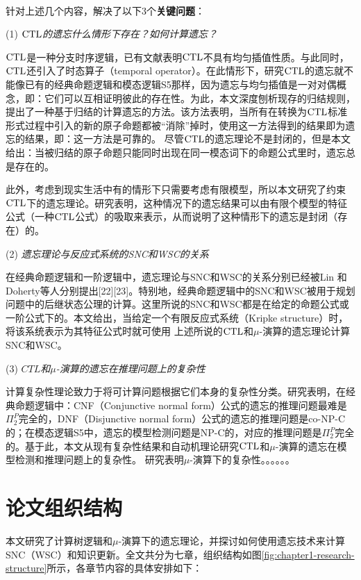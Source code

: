 ~\\
针对上述几个内容，解决了以下3个\textbf{关键问题}：

(1) {\em $\textrm{CTL}$的遗忘什么情形下存在？如何计算遗忘？}

$\textrm{CTL}$是一种分支时序逻辑，已有文献表明$\textrm{CTL}$不具有均匀插值性质。与此同时，$\textrm{CTL}$还引入了时态算子（temporal operator）。在此情形下，研究$\textrm{CTL}$的遗忘就不能像已有的经典命题逻辑和模态逻辑S5那样，因为遗忘与均匀插值是一对对偶概念，即：它们可以互相证明彼此的存在性。为此，本文深度刨析现存的归结规则，提出了一种基于归结的计算遗忘的方法。该方法表明，当所有在转换为$\textrm{CTL}$标准形式过程中引入的新的原子命题都被“消除”掉时，使用这一方法得到的结果即为遗忘的结果，即：这一方法是可靠的。
尽管$\textrm{CTL}$的遗忘理论不是封闭的，但是本文给出：当被归结的原子命题只能同时出现在同一模态词下的命题公式里时，遗忘总是存在的。

此外，考虑到现实生活中有的情形下只需要考虑有限模型，所以本文研究了约束$\textrm{CTL}$下的遗忘理论。研究表明，这种情况下的遗忘结果可以由有限个模型的特征公式（一种$\textrm{CTL}$公式）的吸取来表示，从而说明了这种情形下的遗忘是封闭（存在）的。

(2) {\em 遗忘理论与反应式系统的SNC和WSC的关系}

在经典命题逻辑和一阶逻辑中，遗忘理论与SNC和WSC的关系分别已经被Lin 和 Doherty等人分别提出[22][23]。特别地，经典命题逻辑中的SNC和WSC被用于规划问题中的后继状态公理的计算。这里所说的SNC和WSC都是在给定的命题公式或一阶公式下的。本文给出，当给定一个有限反应式系统（Kripke structure）时，将该系统表示为其特征公式时就可使用
上述所说的$\textrm{CTL}$和$\mu$-演算的遗忘理论计算SNC和WSC。



(3) {\em $CTL$和$\mu$-演算的遗忘在推理问题上的复杂性}

计算复杂性理论致力于将可计算问题根据它们本身的复杂性分类。研究表明，在经典命题逻辑中：CNF（Conjunctive normal form）公式的遗忘的推理问题最难是$\Pi_2^P$完全的，DNF（Disjunctive normal form）公式的遗忘的推理问题是co-NP-C的；在模态逻辑S5中，遗忘的模型检测问题是NP-C的，对应的推理问题是$\Pi_2^P$完全的。基于此，本文从现有复杂性结果和自动机理论研究$\textrm{CTL}$和$\mu$-演算的遗忘在模型检测和推理问题上的复杂性。
研究表明$\mu$-演算下的复杂性。。。。。。








\section{论文组织结构}
本文研究了计算树逻辑和$\mu$-演算下的遗忘理论，并探讨如何使用遗忘技术来计算SNC（WSC）和知识更新。全文共分为七章，组织结构如图\ref{fig:chapter1-research-structure}所示，各章节内容的具体安排如下：


